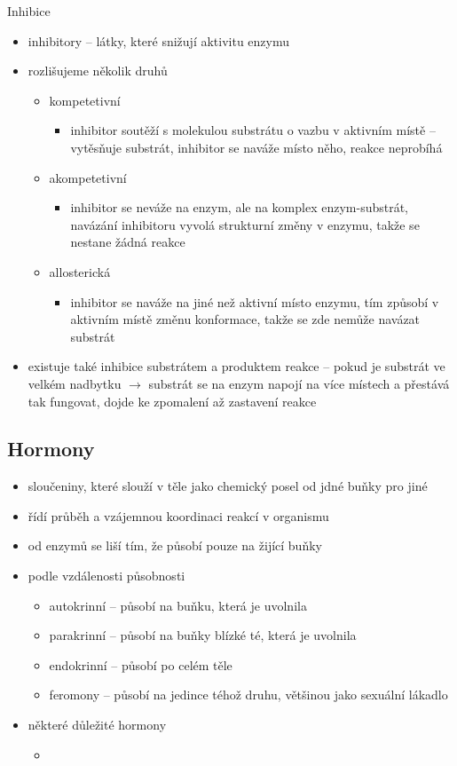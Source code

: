 \documentclass{article}
\begin{document}
Inhibice
\begin{itemize}
  \item inhibitory -- látky, které snižují aktivitu enzymu
  \item rozlišujeme několik druhů
  \begin{itemize}
    \item kompetetivní
    \begin{itemize}
      \item inhibitor soutěží s molekulou substrátu o vazbu v aktivním místě -- vytěsňuje substrát, inhibitor se naváže místo něho, reakce neprobíhá
    \end{itemize}
    \item akompetetivní
    \begin{itemize}
      \item inhibitor se neváže na enzym, ale na komplex enzym-substrát, navázání inhibitoru vyvolá strukturní změny v enzymu, takže se nestane žádná reakce
    \end{itemize}
    \item allosterická
    \begin{itemize}
      \item inhibitor se naváže na jiné než aktivní místo enzymu, tím způsobí v aktivním místě změnu konformace, takže se zde nemůže navázat substrát
    \end{itemize}
  \end{itemize}
  \item existuje také inhibice substrátem a produktem reakce -- pokud je substrát ve velkém nadbytku $\rightarrow$ substrát se na enzym napojí na více místech a přestává tak fungovat, dojde ke zpomalení až zastavení reakce
\end{itemize}

\subsection{Hormony}
\begin{itemize}
  \item sloučeniny, které slouží v těle jako chemický posel od jdné buňky pro jiné
  \item řídí průběh a vzájemnou koordinaci reakcí v organismu
  \item od enzymů se liší tím, že působí pouze na žijící buňky
  \item podle vzdálenosti působnosti
  \begin{itemize}
    \item autokrinní -- působí na buňku, která je uvolnila
    \item parakrinní -- působí na buňky blízké té, která je uvolnila
    \item endokrinní -- působí po celém těle
    \item feromony -- působí na jedince téhož druhu, většinou jako sexuální lákadlo
  \end{itemize}
  \item některé důležité hormony
  \begin{itemize}
    \item
  \end{itemize}
\end{itemize}
\end{document}
